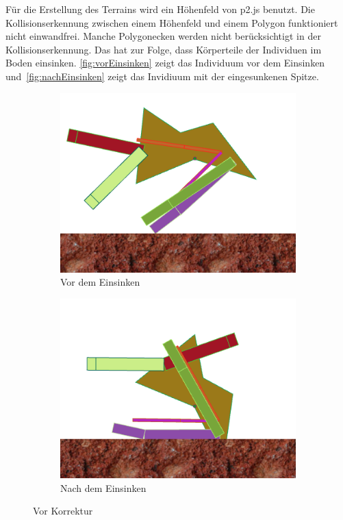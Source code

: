         Für die Erstellung des Terrains wird ein Höhenfeld von p2.js benutzt.
        Die Kollisionserkennung zwischen einem Höhenfeld und einem Polygon funktioniert nicht einwandfrei.
        Manche Polygonecken werden nicht berücksichtigt in der Kollisionserkennung.
        Das hat zur Folge, dass Körperteile der Individuen im Boden einsinken.
        \vref{fig:vorEinsinken} zeigt das Individuum vor dem Einsinken und~\vref{fig:nachEinsinken} zeigt das Invidiuum mit der eingesunkenen Spitze.

        \begin{figure}[H]
          \centering
          \begin{subfigure}[b]{0.45\textwidth}
            \includegraphics[width=\linewidth,center]{graphics/physics-engine/sink-0}
            \caption{Vor dem Einsinken\label{fig:vorEinsinken}}
          \end{subfigure}
          \qquad
          \begin{subfigure}[b]{0.45\textwidth}
            \includegraphics[width=\linewidth,center]{graphics/physics-engine/sink-1}
            \caption{Nach dem Einsinken\label{fig:nachEinsinken}}
          \end{subfigure}
          \caption{Vor Korrektur}
        \end{figure}

